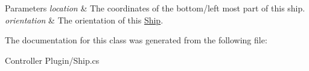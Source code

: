 \begin{DoxyParams}{Parameters}
{\em location} & The coordinates of the bottom/left most part of this ship.\\
\hline
{\em orientation} & The orientation of this \hyperlink{class_m_b_c_1_1_core_1_1_ship}{Ship}.\\
\hline
\end{DoxyParams}


The documentation for this class was generated from the following file\-:\begin{DoxyCompactItemize}
\item 
Controller Plugin/Ship.\-cs\end{DoxyCompactItemize}
